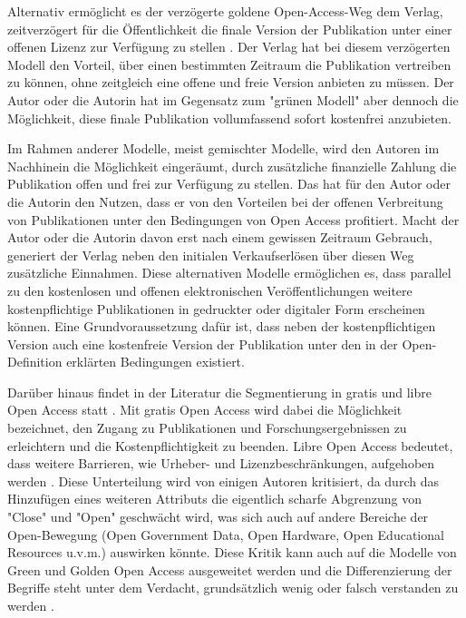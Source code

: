 Alternativ ermöglicht es der verzögerte goldene Open-Access-Weg dem Verlag, zeitverzögert für die Öffentlichkeit die finale Version der Publikation unter einer offenen Lizenz zur Verfügung zu stellen \cite{lewis_2012_inevitability}. Der Verlag hat bei diesem verzögerten Modell den Vorteil, über einen bestimmten Zeitraum die Publikation vertreiben zu können, ohne zeitgleich eine offene und freie Version anbieten zu müssen. Der Autor oder die Autorin hat im Gegensatz zum "grünen Modell" aber dennoch die Möglichkeit, diese finale Publikation vollumfassend sofort kostenfrei anzubieten.

Im Rahmen anderer Modelle, meist gemischter Modelle, wird den Autoren im Nachhinein die Möglichkeit eingeräumt, durch zusätzliche finanzielle Zahlung die Publikation offen und frei zur Verfügung zu stellen\cite{lewis_2012_inevitability}. Das hat für den Autor oder die Autorin den Nutzen, dass er von den Vorteilen bei der offenen Verbreitung von Publikationen unter den Bedingungen von Open Access profitiert. Macht der Autor oder die Autorin davon erst nach einem gewissen Zeitraum Gebrauch, generiert der Verlag neben den initialen Verkaufserlösen über diesen Weg zusätzliche Einnahmen. Diese alternativen Modelle ermöglichen es, dass parallel zu den kostenlosen und offenen elektronischen Veröffentlichungen weitere kostenpflichtige Publikationen in gedruckter oder digitaler Form erscheinen können. Eine Grundvoraussetzung dafür ist, dass neben der kostenpflichtigen Version auch eine kostenfreie Version der Publikation unter den in der Open-Definition erklärten Bedingungen existiert.

Darüber hinaus findet in der Literatur die Segmentierung in gratis und libre Open Access statt \cite{Martin_2013} \cite{naeder_2010_open} \cite{Mounce_2015}. Mit gratis Open Access wird dabei die Möglichkeit bezeichnet, den Zugang zu Publikationen und Forschungsergebnissen zu erleichtern und die Kostenpflichtigkeit zu beenden. Libre Open Access bedeutet, dass weitere Barrieren, wie Urheber- und Lizenzbeschränkungen, aufgehoben werden \cite{Adema_2014_open_access}. Diese Unterteilung wird von einigen Autoren kritisiert, da durch das Hinzufügen eines weiteren Attributs die eigentlich scharfe Abgrenzung von "Close" und "Open" geschwächt wird, was sich auch auf andere Bereiche der Open-Bewegung (Open Government Data, Open Hardware, Open Educational Resources‎ u.v.m.) auswirken könnte. Diese Kritik kann auch auf die Modelle von Green und Golden Open Access ausgeweitet werden und die Differenzierung der Begriffe steht unter dem Verdacht, grundsätzlich wenig oder falsch verstanden zu werden \cite{Mounce_2015}.

